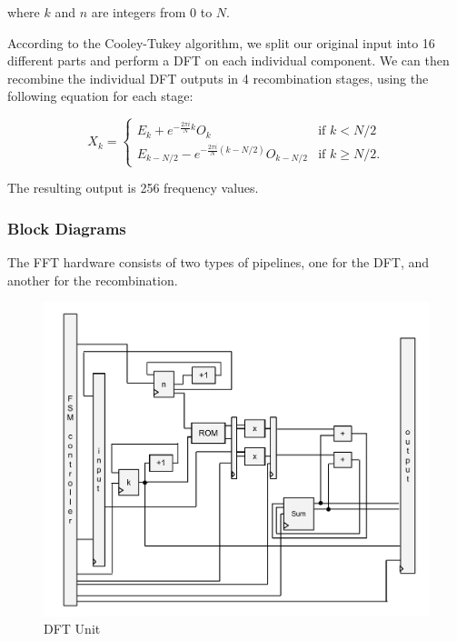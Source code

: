 \documentclass{article}
\begin{document}
	where \(k\) and \(n\) are integers from 0 to \(N\). 
	
	According to the Cooley-Tukey algorithm, 
	we split our original input into 16 different parts and perform a DFT on each
	individual component. We can then recombine the individual DFT outputs in 4
	recombination stages, using the following equation for each stage: 
	
	\begin{equation}
		X_k = \left\{
		\begin{matrix}
			E_k + e^{-\frac{2\pi i}{N}k} O_k		& 	\mbox{if } k < N/2 \\ 
			E_{k-N/2} - e^{-\frac{2\pi i}{N} (k-N/2)} O_{k-N/2} & 	\mbox{if }
			k \geq N/2. 
		\end{matrix} 
		\right.
	\end{equation}
	
	The resulting output is 256 frequency values.

	\newpage
	
	\subsubsection{Block Diagrams}

	The FFT hardware consists of two types of pipelines, one for the DFT,
	and another for the recombination. 

	\begin{figure}[H]
		\centering
		\includegraphics[scale=0.3]{dft-unit}
		\caption{DFT Unit}
	\end{figure}
\end{document}
